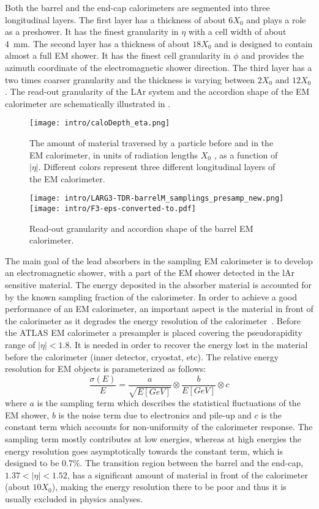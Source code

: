 Both the barrel and the end-cap calorimeters are segmented into three longitudinal layers. The first layer has a thickness of about $6 X_0$ and plays a role as a preshower. It has the finest granularity in $\eta$ with a cell width of about 4~mm. The second layer has a thickness of about $18 X_0$ and is designed to contain almost a full EM shower. It has the finest cell granularity in $\phi$ and provides the azimuth coordinate of the electromagnetic shower direction. The third layer has a two times coarser granularity and the thickness is varying between $2 X_0$ and $12 X_0$. The read-out granularity of the LAr system and the accordion shape of the EM calorimeter are schematically illustrated in .

\begin{figure}[h!]
\centering
 \texttt{[image: intro/caloDepth\_eta.png]}
 \caption{
 The amount of material traversed by a particle before and in the EM calorimeter, in units of radiation lengths $X_0$ , as a function of $|\eta|$. Different colors represent three different longitudinal layers of the EM calorimeter.}
\label{fig:Calo}
\end{figure}

\begin{figure}[h!]
\centering
 \texttt{[image: intro/LARG3-TDR-barrelM\_samplings\_presamp\_new.png]}
 \texttt{[image: intro/F3-eps-converted-to.pdf]}
 \caption{Read-out granularity and accordion shape of the barrel EM calorimeter.}
\label{fig:EMgran}
\end{figure}

The main goal of the lead absorbers in the sampling EM calorimeter is to develop an electromagnetic shower, with a part of the EM shower detected in the lAr sensitive material. The energy deposited in the absorber material is accounted for by the known sampling fraction of the calorimeter. In order to achieve a good performance of an EM calorimeter, an important aspect is the material in front of the calorimeter as it degrades the energy resolution of the calorimeter~\cite{electron_tight}.
Before the ATLAS EM calorimeter a presampler is placed covering the pseudorapidity range of $|\eta|<1.8$. It is needed in order to recover the energy lost in the material before the calorimeter (inner detector, cryostat, etc).
The relative energy resolution for EM objects is parameterized as follows:
\begin{equation}
\frac{\sigma(E)}{E}=\frac{a}{\sqrt{E[GeV]}}\otimes\frac{b}{E[GeV]}\otimes c
\end{equation}
where $a$ is the sampling term which describes the statistical fluctuations of the EM shower, $b$ is the noise term due to electronics and pile-up and $c$ is the constant term which accounts for non-uniformity of the calorimeter response. The sampling term mostly contributes at low energies, whereas at high energies the energy resolution goes asymptotically towards the constant term, which is designed to be 0.7\%.
The transition region between the barrel and the end-cap, $1.37<|\eta|<1.52$, has a significant amount of material in front of the calorimeter (about $ 10 X_0$), making the energy resolution there to be poor and thus it is usually excluded in physics analyses.

